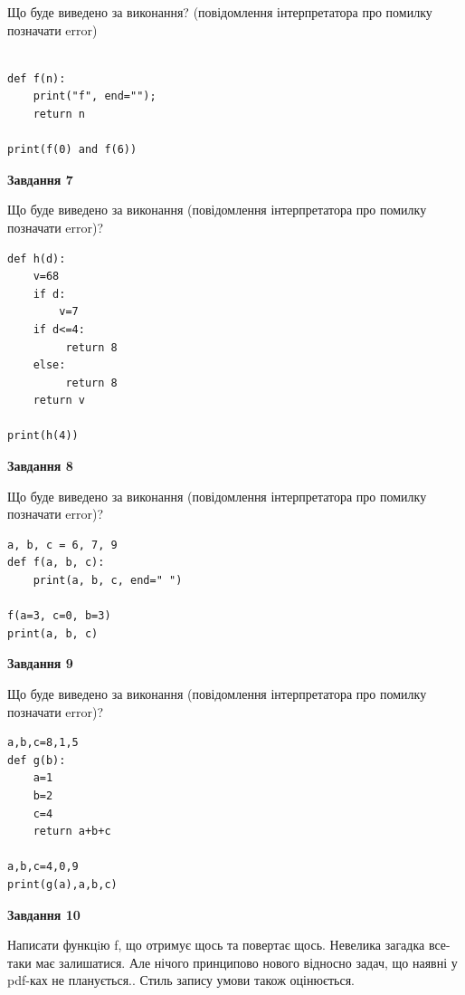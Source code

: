 \documentclass[12pt, ukrainian]{article}
\begin{document}
{\begin {large}
Що буде виведено за виконання? (повідомлення інтерпретатора про помилку позначати error)\par
\begin{verbatim}

def f(n):
    print("f", end="");
    return n

print(f(0) and f(6))
\end{verbatim}

{\begin {center}\textbf{Завдання 7}\end {center}}

Що буде виведено за виконання (повідомлення інтерпретатора про помилку позначати error)?\par
\begin{verbatim}
def h(d):
    v=68
    if d: 
        v=7
    if d<=4:
         return 8
    else:
         return 8
    return v

print(h(4))
\end{verbatim}

{\begin {center}\textbf{Завдання 8}\end {center}}

Що буде виведено за виконання (повідомлення інтерпретатора про помилку позначати error)?\par
\begin{verbatim}
a, b, c = 6, 7, 9
def f(a, b, c):
    print(a, b, c, end=" ")

f(a=3, c=0, b=3)
print(a, b, c)
\end{verbatim}

{\begin {center}\textbf{Завдання 9}\end {center}}

Що буде виведено за виконання (повідомлення інтерпретатора про помилку позначати error)?\par
\begin{verbatim}
a,b,c=8,1,5
def g(b):
    a=1
    b=2
    c=4
    return a+b+c

a,b,c=4,0,9
print(g(a),a,b,c)
\end{verbatim}

{\begin {center}\textbf{Завдання 10}\end {center}}


Написати функцiю f, що отримує щось та повертає щось. Невелика загадка все-таки має залишатися. Але нічого принципово нового відносно задач, що наявні у pdf-ках не планується.. Стиль запису умови також оцінюється.\par
\end {large}}
\newpage
\end{document}
